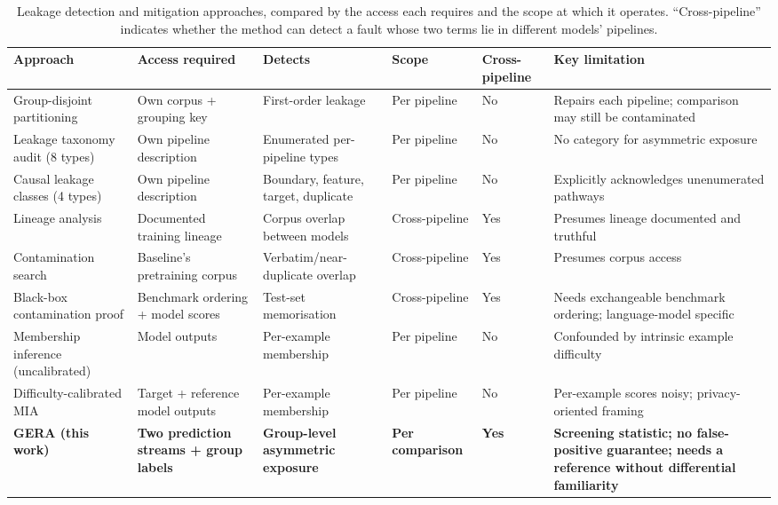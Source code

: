 \begin{table}[pos=htbp]
\centering
\caption{Leakage detection and mitigation approaches, compared by the access each requires and the scope at which it operates. ``Cross-pipeline'' indicates whether the method can detect a fault whose two terms lie in different models' pipelines.}
\label{tab:1}
\footnotesize
\begin{tabularx}{\textwidth}{XXXXXX}
\toprule
\textbf{Approach} & \textbf{Access required} & \textbf{Detects} & \textbf{Scope} & \textbf{Cross-pipeline} & \textbf{Key limitation} \\
\midrule
Group-disjoint partitioning & Own corpus + grouping key & First-order leakage & Per pipeline & No & Repairs each pipeline; comparison may still be contaminated \\
Leakage taxonomy audit (8 types) & Own pipeline description & Enumerated per-pipeline types & Per pipeline & No & No category for asymmetric exposure \\
Causal leakage classes (4 types) & Own pipeline description & Boundary, feature, target, duplicate & Per pipeline & No & Explicitly acknowledges unenumerated pathways \\
Lineage analysis & Documented training lineage & Corpus overlap between models & Cross-pipeline & Yes & Presumes lineage documented and truthful \\
Contamination search & Baseline's pretraining corpus & Verbatim/near-duplicate overlap & Cross-pipeline & Yes & Presumes corpus access \\
Black-box contamination proof & Benchmark ordering + model scores & Test-set memorisation & Cross-pipeline & Yes & Needs exchangeable benchmark ordering; language-model specific \\
Membership inference (uncalibrated) & Model outputs & Per-example membership & Per pipeline & No & Confounded by intrinsic example difficulty \\
Difficulty-calibrated MIA & Target + reference model outputs & Per-example membership & Per pipeline & No & Per-example scores noisy; privacy-oriented framing \\
\textbf{GERA (this work)} & \textbf{Two prediction streams + group labels} & \textbf{Group-level asymmetric exposure} & \textbf{Per comparison} & \textbf{Yes} & \textbf{Screening statistic; no false-positive guarantee; needs a reference without differential familiarity} \\
\bottomrule
\end{tabularx}
\end{table}

